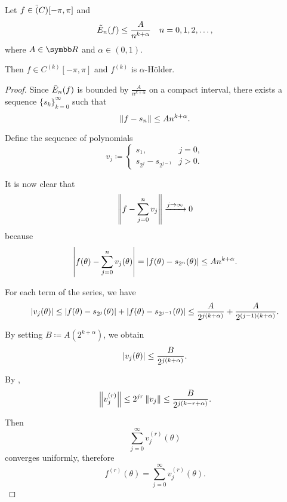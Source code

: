 \begin{theorem}\label{thm:bernsteins_trigonometric_theorem}
  Let \( f \in \tilde{(}C)[-\pi, \pi] \) and
  \begin{equation*}
    \tilde{E}_n(f) \leq \frac A {n^{k+\alpha}} \quad n = 0, 1, 2, \ldots,
  \end{equation*}
  where \( A \in \BR \) and \( \alpha \in (0, 1) \).

  Then \( f \in C^{(k)}[-\pi, \pi] \) and \( f^{(k)} \) is \( \alpha \)-H\"older.
\end{theorem}
\begin{proof}
  Since \( \tilde{E}_n(f) \) is bounded by \( \frac A {n^{k+\alpha}} \) on a compact interval, there exists a sequence \( \{ s_k \}_{k=0}^\infty \) such that
  \begin{equation*}
    \left\Vert f - s_n \right\Vert \leq A {n^{k+\alpha}}.
  \end{equation*}

  Define the sequence of polynomials
  \begin{equation*}
    v_j \coloneqq \begin{cases}
      s_1,                  &j = 0, \\
      s_{2^j} - s_{2^{j-1}} &j > 0.
    \end{cases}
  \end{equation*}

  It is now clear that
  \begin{equation*}
    \left\Vert f - \sum_{j=0}^n v_j \right\Vert \xrightarrow[]{j \to \infty} 0
  \end{equation*}
  because
  \begin{equation*}
    \left\vert f(\theta) - \sum_{j=0}^n v_j (\theta) \right\vert
    =
    \left\vert f(\theta) - s_{2^n}(\theta) \right\vert
    \leq
    A {n^{k+\alpha}}.
  \end{equation*}

  For each term of the series, we have
  \begin{equation*}
    \left\vert v_j(\theta) \right\vert
    \leq
    \left\vert f(\theta) - s_{2^j}(\theta) \right\vert + \left\vert f(\theta) - s_{2^{j-1}}(\theta) \right\vert
    \leq
    \frac A {2^{j(k + \alpha)}} + \frac A {2^{(j - 1) (k + \alpha)}}.
  \end{equation*}

  By setting \( B \coloneqq A (2^{k + \alpha}) \), we obtain
  \begin{equation*}
    \left\vert v_j(\theta) \right\vert \leq \frac B {2^{j(k + \alpha)}}.
  \end{equation*}

  By ,
  \begin{equation*}
    \left\Vert v_j^{(r)} \right\Vert \leq 2^{jr} \left\Vert v_j \right\Vert \leq \frac B {2^{j(k - r + \alpha)}}.
  \end{equation*}

  Then
  \begin{equation*}
    \sum_{j=0}^\infty v_j^{(r)} (\theta)
  \end{equation*}
  converges uniformly, therefore
  \begin{equation*}
    f^{(r)}(\theta) = \sum_{j=0}^\infty v_j^{(r)} (\theta).
  \end{equation*}
\end{proof}

